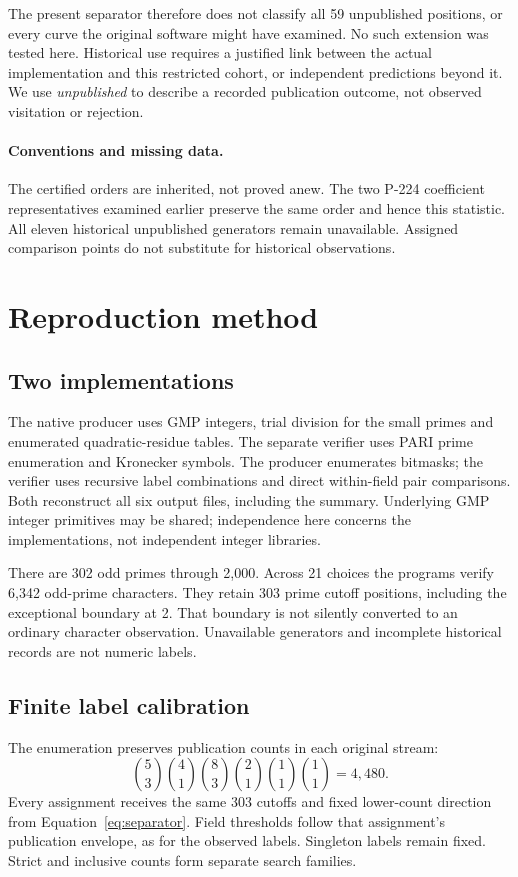 \documentclass[11pt]{article}
\begin{document}
The present separator therefore does not classify all 59 unpublished
positions, or every curve the original software might have examined.
No such extension was tested here. Historical use requires a justified
link between the actual implementation and this restricted cohort, or
independent predictions beyond it. We use \emph{unpublished} to describe
a recorded publication outcome, not observed visitation or rejection.

\paragraph{Conventions and missing data.}
The certified orders are inherited, not proved anew. The two P-224
coefficient representatives examined earlier preserve the same order
and hence this statistic. All eleven historical unpublished generators
remain unavailable. Assigned comparison points do not substitute for
historical observations.

\section{Reproduction method}
\subsection{Two implementations}
The native producer uses GMP integers, trial division for the small primes
and enumerated quadratic-residue tables. The separate verifier uses PARI
prime enumeration and Kronecker symbols. The producer enumerates bitmasks;
the verifier uses recursive label combinations and direct within-field
pair comparisons. Both reconstruct all six output files, including the
summary. Underlying GMP integer primitives may be shared; independence
here concerns the implementations, not independent integer libraries.

There are 302 odd primes through 2,000. Across 21 choices the programs
verify 6,342 odd-prime characters. They retain 303 prime cutoff positions,
including the exceptional boundary at 2. That boundary is not silently
converted to an ordinary character observation. Unavailable generators
and incomplete historical records are not numeric labels.

\subsection{Finite label calibration}
The enumeration preserves publication counts in each original stream:
\begin{equation}
 {5\choose3}{4\choose1}{8\choose3}{2\choose1}
 {1\choose1}{1\choose1}=4,480.
 \label{eq:labelspace}
\end{equation}
Every assignment receives the same 303 cutoffs and fixed lower-count
direction from Equation~\eqref{eq:separator}. Field thresholds follow
that assignment's publication envelope, as for the observed labels.
Singleton labels remain fixed. Strict and inclusive counts form separate
search families.
\end{document}
